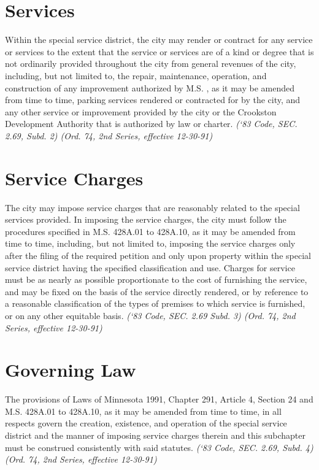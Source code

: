 \documentclass[code.tex]{subfiles}
\begin{document}
\section{Services}
Within the special service district, the city may render or contract for any service or services to the extent that the service or services are of a kind or degree that is not ordinarily provided throughout the city from general revenues of the city, including, but not limited to, the repair, maintenance, operation, and construction of any improvement authorized by M.S. , as it may be amended from time to time, parking services rendered or contracted for by the city, and any other service or improvement provided by the city or the Crookston Development Authority that is authorized by law or charter.\newline
\emph{(‘83 Code, SEC. 2.69, Subd. 2)  (Ord. 74, 2nd Series, effective 12-30-91)}
\section{Service Charges}
The city may impose service charges that are reasonably related to the special services provided.  In imposing the service charges, the city must follow the procedures specified in M.S. \textsection 428A.01 to \textsection 428A.10, as it may be amended from time to time, including, but not limited to, imposing the service charges only after the filing of the required petition and only upon property within the special service district having the specified classification and use.  Charges for service must be as nearly as possible proportionate to the cost of furnishing the service, and may be fixed on the basis of the service directly rendered, or by reference to a reasonable classification of the types of premises to which service is furnished, or on any other equitable basis.\newline
\emph{(‘83 Code, SEC. 2.69 Subd. 3)  (Ord. 74, 2nd Series, effective 12-30-91)}
\section{Governing Law}
The provisions of Laws of Minnesota 1991, Chapter 291, Article 4, Section 24 and M.S. \textsection 428A.01 to \textsection 428A.10, as it may be amended from time to time, in all respects govern the creation, existence, and operation of the special service district and the manner of imposing service charges therein and this subchapter must be construed consistently with said statutes.\newline
\emph{(‘83 Code, SEC. 2.69, Subd. 4)  (Ord. 74, 2nd Series, effective 12-30-91)}
\end{document}
